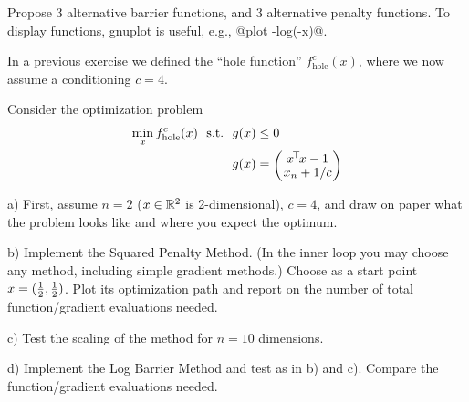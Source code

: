 Propose 3 alternative barrier functions, and 3 alternative penalty
functions. To display functions, gnuplot is useful, e.g.,
@plot -log(-x)@.







In a previous exercise we defined the ``hole function''
$f^c_{\text{hole}}(x)$, where we now assume a conditioning $c=4$.

Consider the optimization problem
\begin{align}
\min_x f^c_{\text{hole}}(x) \st& g(x) \le 0 \\
& g(x) = \mat{c}{x^\T x - 1 \\ x_n + 1/c}
\end{align}

a) First, assume $n=2$ ($x\in{\mathbb{R}}^2$ is 2-dimensional), $c=4$, and
draw on paper what the problem looks like and where you expect the
optimum.

b) Implement the Squared Penalty Method. (In the inner loop you may
choose any method, including simple gradient methods.) Choose as a
start point $x=(\frac{1}{2}, \frac{1}{2})$. Plot its optimization path and report
on the number of total function/gradient evaluations needed.

c) Test the scaling of the method for $n=10$ dimensions.

d) Implement the Log Barrier Method and test as in b) and
c). Compare the function/gradient evaluations needed.








\exerfoot
